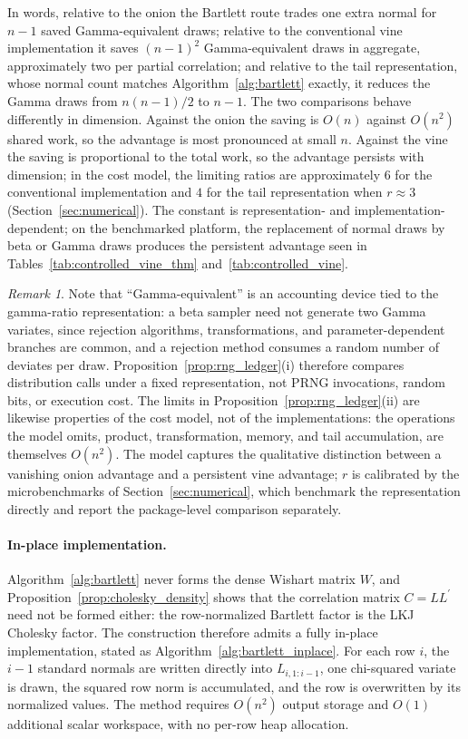 \documentclass[12pt,english]{article}
\theoremstyle{plain} %
\theoremstyle{definition} %
\theoremstyle{remark} %
\newtheorem{remark}{Remark}
\begin{document}
In words, relative to the onion the Bartlett route trades one extra normal for $n-1$ saved Gamma-equivalent draws; relative to the conventional vine implementation it saves $(n-1)^2$ Gamma-equivalent draws in aggregate, approximately two per partial correlation; and relative to the tail representation, whose normal count matches Algorithm~\ref{alg:bartlett} exactly, it reduces the Gamma draws from $n(n-1)/2$ to $n-1$. The two comparisons behave differently in dimension. Against the onion the saving is $O(n)$ against $O(n^2)$ shared work, so the advantage is most pronounced at small $n$. Against the vine the saving is proportional to the total work, so the advantage persists with dimension; in the cost model, the limiting ratios are approximately $6$ for the conventional implementation and $4$ for the tail representation when $r\approx3$ (Section~\ref{sec:numerical}). The constant is representation- and implementation-dependent; on the benchmarked platform, the replacement of normal draws by beta or Gamma draws produces the persistent advantage seen in Tables~\ref{tab:controlled_vine_thm} and~\ref{tab:controlled_vine}.

\begin{remark}
\label{rem:scope}
Note that ``Gamma-equivalent'' is an accounting device tied to the gamma-ratio representation: a beta sampler need not generate two Gamma variates, since rejection algorithms, transformations, and parameter-dependent branches are common, and a rejection method consumes a random number of deviates per draw. Proposition~\ref{prop:rng_ledger}(i) therefore compares distribution calls under a fixed representation, not PRNG invocations, random bits, or execution cost. The limits in Proposition~\ref{prop:rng_ledger}(ii) are likewise properties of the cost model, not of the implementations: the operations the model omits, product, transformation, memory, and tail accumulation, are themselves $O(n^2)$. The model captures the qualitative distinction between a vanishing onion advantage and a persistent vine advantage; $r$ is calibrated by the microbenchmarks of Section~\ref{sec:numerical}, which benchmark the representation directly and report the package-level comparison separately.
\end{remark}

\paragraph{In-place implementation.}
Algorithm~\ref{alg:bartlett} never forms the dense Wishart matrix $W$, and Proposition~\ref{prop:cholesky_density} shows that the correlation matrix $C=LL^\prime$ need not be formed either: the row-normalized Bartlett factor is the LKJ Cholesky factor. The construction therefore admits a fully in-place implementation, stated as Algorithm~\ref{alg:bartlett_inplace}. For each row $i$, the $i-1$ standard normals are written directly into $L_{i,1:i-1}$, one chi-squared variate is drawn, the squared row norm is accumulated, and the row is overwritten by its normalized values. The method requires $O(n^2)$ output storage and $O(1)$ additional scalar workspace, with no per-row heap allocation.
\end{document}
